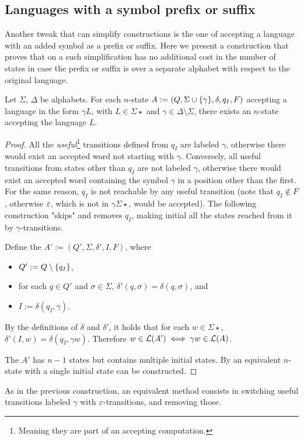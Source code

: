 \subsection{Languages with a symbol prefix or suffix}
Another tweak that can simplify constructions is the one of accepting a language with an added symbol as a prefix or suffix.
Here we present a construction that proves that on a \ONFA such simplification has no additional cost in the number of states in case the prefix or suffix is over a separate alphabet with respect to the original language.
\begin{thrm}
	Let $\Sigma$, $\Delta$ be alphabets.
	For each $n$-state \ONFA $A:=(Q,\Sigma\cup\{\gamma\},\delta,q_I,F)$ accepting a language in the form $\gamma L$, with $L\in\Sigma\star$ and $\gamma\in\Delta\setminus\Sigma$, there exists an $n$-state \ONFA accepting the language $L$.
\end{thrm}
\begin{proof}
	All the \emph{useful}\footnote{Meaning they are part of an accepting computation.} transitions defined from $q_I$ are labeled $\gamma$, otherwise there would exist an accepted word not starting with $\gamma$.
	Conversely, all useful transitions from states other than $q_I$ are not labeled $\gamma$, otherwise there would exist an accepted word containing the symbol $\gamma$ in a position other than the first.
	For the same reason, $q_I$ is not reachable by any useful transition (note that $q_I\notin F$, otherwise $\varepsilon$, which is not in $\gamma\Sigma\star$, would be accepted).
	The following construction "skips" and removes $q_I$, making initial all the states reached from it by $\gamma$-transitions.

	Define the \ONFA $A':=(Q',\Sigma,\delta',I,F)$, where
	\begin{itemize}
		\item $Q':=Q\setminus\{q_I\}$,
		\item for each $q\in Q'$ and $\sigma\in\Sigma$, $\delta'(q,\sigma)=\delta(q,\sigma)$, and
		\item $I:=\delta(q_I,\gamma)$.
	\end{itemize}

	By the definitions of $\delta$ and $\delta'$, it holds that for each $w\in\Sigma\star$, $\delta'(I,w)=\delta(q_I,\gamma w)$.
	Therefore $w\in\mathcal L(A')\iff \gamma w\in\mathcal L(A)$.

	The \ONFA $A'$ has $n-1$ states but contains multiple initial states. By  an equivalent $n$-state \ONFA with a single initial state can be constructed.
\end{proof}
As in the previous construction, an equivalent method consists in switching useful transitions labeled $\gamma$ with $\varepsilon$-transitions, and removing those.

